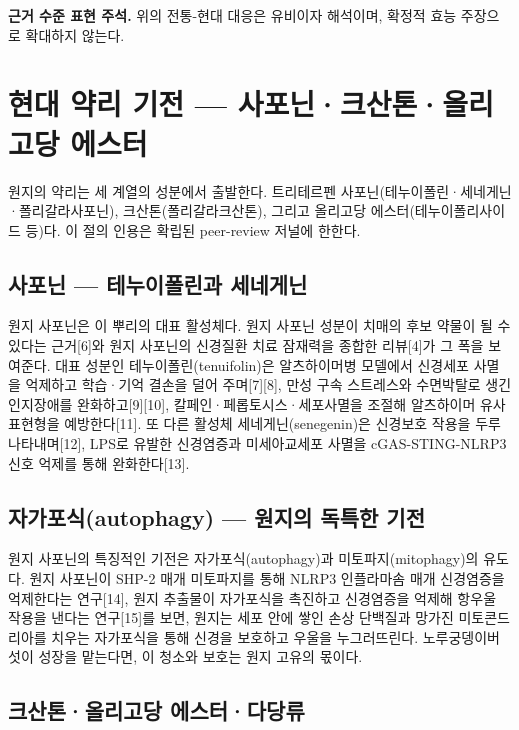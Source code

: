 \documentclass[12pt,oneside]{book}
\newenvironment{authnote}
  {\par\smallskip\begingroup\leftskip=6mm\rightskip=3mm\small\color{muted}\noindent\ignorespaces}
  {\par\endgroup\smallskip}
\begin{document}
\begin{authnote}\textbf{근거 수준 표현 주석.} 위의 전통-현대 대응은 유비이자 해석이며, 확정적 효능 주장으로 확대하지 않는다.\end{authnote}

\section{현대 약리 기전 — 사포닌·크산톤·올리고당 에스터}

원지의 약리는 세 계열의 성분에서 출발한다. 트리테르펜 사포닌(테누이폴린·세네게닌·폴리갈라사포닌), 크산톤(폴리갈라크산톤), 그리고 올리고당 에스터(테누이폴리사이드 등)다. 이 절의 인용은 확립된 peer-review 저널에 한한다.

\subsection{사포닌 — 테누이폴린과 세네게닌}

원지 사포닌은 이 뿌리의 대표 활성체다. 원지 사포닌 성분이 치매의 후보 약물이 될 수 있다는 근거[6]와 원지 사포닌의 신경질환 치료 잠재력을 종합한 리뷰[4]가 그 폭을 보여준다. 대표 성분인 테누이폴린(tenuifolin)은 알츠하이머병 모델에서 신경세포 사멸을 억제하고 학습·기억 결손을 덜어 주며[7][8], 만성 구속 스트레스와 수면박탈로 생긴 인지장애를 완화하고[9][10], 칼페인·페롭토시스·세포사멸을 조절해 알츠하이머 유사 표현형을 예방한다[11]. 또 다른 활성체 세네게닌(senegenin)은 신경보호 작용을 두루 나타내며[12], LPS로 유발한 신경염증과 미세아교세포 사멸을 cGAS-STING-NLRP3 신호 억제를 통해 완화한다[13].

\subsection{자가포식(autophagy) — 원지의 독특한 기전}

원지 사포닌의 특징적인 기전은 자가포식(autophagy)과 미토파지(mitophagy)의 유도다. 원지 사포닌이 SHP-2 매개 미토파지를 통해 NLRP3 인플라마솜 매개 신경염증을 억제한다는 연구[14], 원지 추출물이 자가포식을 촉진하고 신경염증을 억제해 항우울 작용을 낸다는 연구[15]를 보면, 원지는 세포 안에 쌓인 손상 단백질과 망가진 미토콘드리아를 치우는 자가포식을 통해 신경을 보호하고 우울을 누그러뜨린다. 노루궁뎅이버섯이 성장을 맡는다면, 이 청소와 보호는 원지 고유의 몫이다.

\subsection{크산톤·올리고당 에스터·다당류}
\end{document}

